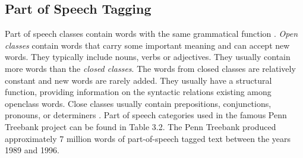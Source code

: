 \documentclass[11pt,openany,executivepaper]{book}
\begin{document}
\subsection{Part of Speech Tagging}
Part of speech classes contain words with the same grammatical function \cite{241}. \textit{Open classes} contain words that carry some important meaning and can accept new words. They typically include nouns, verbs or adjectives. They usually contain more words than the \textit{closed classes}. The words from closed classes are relatively constant and new words are rarely added. They usually have a structural function, providing information on the syntactic relations existing among openclass words. Close classes usually contain prepositions, conjunctions, pronouns, or determiners \cite{116}. Part of speech categories used in the famous Penn Treebank project can be found in Table 3.2. The Penn Treebank produced approximately 7 million words of part-of-speech tagged text between the years 1989 and 1996.
\clearpage
\end{document}
